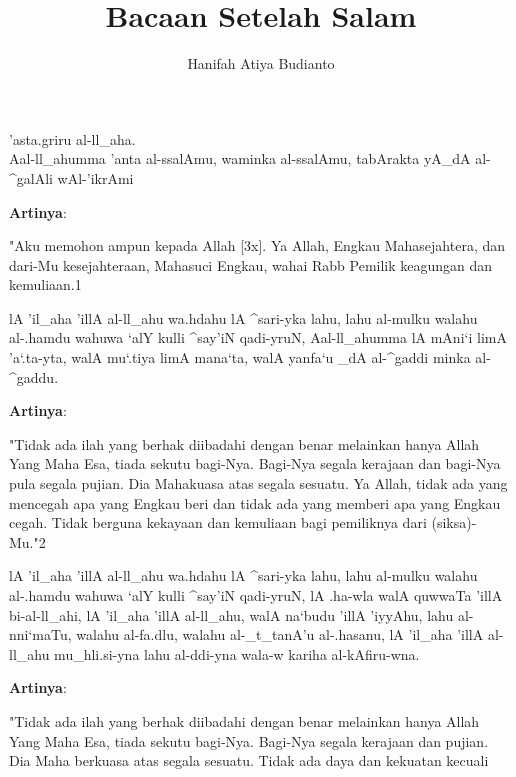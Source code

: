 \documentclass[a4paper,12pt]{article}
\title{\Large Bacaan Setelah Salam}
\author{\calligra Hanifah Atiya Budianto}
\begin{document}
\sffamily
\maketitle 
\fullvocalize
{}
\begin{arabtext}
\noindent
'asta.griru al-ll_aha.\\
Aal-ll_ahumma 'anta al-ssalAmu, waminka al-ssalAmu, tabArakta yA_dA 
al-^galAli wAl-'ikrAmi\\
\end{arabtext}
\noindent
\textbf{Artinya}:
\par
\indent
"Aku memohon ampun kepada Allah [3x]. Ya Allah, Engkau Mahasejahtera, dan 
dari-Mu kesejahteraan, Mahasuci Engkau, wahai Rabb Pemilik keagungan dan 
kemuliaan.{\scriptsize 1}\\
\begin{arabtext}
\noindent
lA 'il_aha 'illA al-ll_ahu wa.hdahu lA ^sari-yka lahu, lahu al-mulku walahu 
al-.hamdu wahuwa `alY kulli ^say'iN qadi-yruN, Aal-ll_ahumma lA mAni`i limA 
'a`.ta-yta, walA mu`.tiya limA mana`ta, walA yanfa`u _dA al-^gaddi minka 
al-^gaddu.\\
\end{arabtext}
\noindent
\textbf{Artinya}:
\par
\indent
"Tidak ada ilah yang berhak diibadahi dengan benar melainkan hanya Allah 
Yang Maha Esa, tiada sekutu bagi-Nya. Bagi-Nya segala kerajaan dan bagi-Nya 
pula segala pujian. Dia Mahakuasa atas segala sesuatu. Ya Allah, tidak ada 
yang mencegah apa yang Engkau beri dan tidak ada yang memberi apa yang 
Engkau cegah. Tidak berguna kekayaan dan kemuliaan bagi pemiliknya dari 
(siksa)-Mu."{\scriptsize 2}\\
\begin{arabtext}
\noindent
lA 'il_aha 'illA al-ll_ahu wa.hdahu lA ^sari-yka lahu, lahu al-mulku walahu 
al-.hamdu wahuwa `alY kulli ^say'iN qadi-yruN, lA .ha-wla walA quwwaTa 
'illA bi-al-ll_ahi, lA 'il_aha 'illA al-ll_ahu, walA na`budu 'illA 'iyyAhu, 
lahu al-nni`maTu, walahu al-fa.dlu, walahu al-_t_tanA'u al-.hasanu, lA 
'il_aha 'illA al-ll_ahu mu_hli.si-yna lahu al-ddi-yna wala-w kariha 
al-kAfiru-wna.\\
\end{arabtext}
\noindent
\textbf{Artinya}:
\par
\indent
"Tidak ada ilah yang berhak diibadahi dengan benar melainkan hanya Allah 
Yang Maha Esa, tiada sekutu bagi-Nya. Bagi-Nya segala kerajaan dan pujian. 
Dia Maha berkuasa atas segala sesuatu. Tidak ada daya dan kekuatan kecuali 
\end{document}
